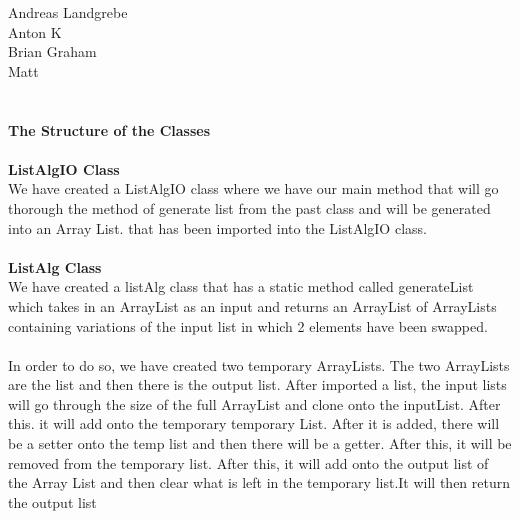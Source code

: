 \documentclass{article}
\begin{document}
Andreas Landgrebe
\\
Anton K
\\
Brian Graham
\\
Matt
\\
\\
\\
{\bf The Structure of the Classes}
\\
\\
{\bf ListAlgIO Class}
\\
We have created a ListAlgIO class where we have our main method that will  go thorough the method of generate list from the past class and will be generated into an Array List. that has been imported into the ListAlgIO class.
\\
\\
{\bf ListAlg Class}
\\
We have created a listAlg class that has a static method called generateList which takes in an ArrayList as an input and returns an ArrayList of ArrayLists containing variations of the input list in which 2 elements have been swapped. 
\\
\\
In order to do so, we have created two temporary ArrayLists. The two ArrayLists are the list and then there is the output list. After imported a list, the input lists will go through the size of the full ArrayList and clone onto the inputList. After this. it will add onto the temporary temporary List. After it is added, there will be a setter onto the temp list and then there will be a getter. After this, it will be removed from the temporary list. After this, it will add onto the output list of the Array List and then clear what is left in the temporary list.It will then return the output list  
\\
\\
\\
 
\end{document}
